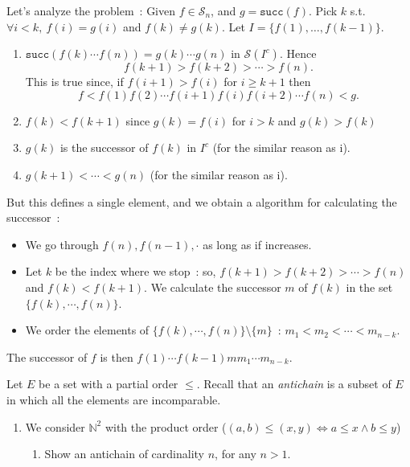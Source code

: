 \documentclass[a4paper,11pt]{exam}
\newcommand{\N}{\mathbb{N}}
\renewcommand{\S}{\mathcal{S}}
\begin{document}
\begin{questions}
\begin{enumerate}
\begin{enumerate}
          \begin{solution}
            \renewcommand{\succ}{\texttt{succ}}
            Let's analyze the problem~:
            Given $f \in \S_n$, and $g=\succ(f)$.
            Pick $k$ s.t. ${\forall i < k,}~f(i) = g(i)$ and $f(k) \neq g(k)$.
            Let $I = \{ f(1), \dots, f(k-1) \}$.
            \begin{enumerate}
              \item $\succ(f(k) \cdots f(n)) = g(k) \cdots g(n)$ in
                $\S(I^c)$. Hence 
                $$ f(k+1) > f(k+2) > \cdots > f(n). $$ 
                This is true since, if  $f(i+1) > f(i)$  for $ i\geq k+1$ then $$f<f(1)f(2)\cdots f(i+1)f(i)f(i+2) \cdots f(n)<g.$$
              \item $f(k) <f(k+1)$ since $g(k)=f(i)$ for $i>k$ and $g(k)>f(k)$
              \item $g(k)$ is the successor of $f(k)$ in $I^c$ (for the similar reason as i).
              \item $g(k+1) < \cdots < g(n)$ (for the similar reason as i).
            \end{enumerate}
           But this defines a single element, and we obtain a algorithm for calculating the successor~:
            \begin{itemize}
              \item We go through $f(n), f(n-1),\cdot$ as long as if increases.
              \item Let $k$ be the index where we stop~:
                so, $f(k+1) > f(k+2) > \cdots > f(n)$ and $f(k) < f(k+1)$. We calculate the successor $m$ of $f(k)$ in the set
                $\{ f(k), \cdots, f(n) \}$.
              \item We order the elements of $\{ f(k), \cdots, f(n) \}
                \setminus \{ m \}$~: $m_1 < m_2 < \cdots < m_{n-k}$.
            \end{itemize}
            The successor of $f$ is then
            $f(1) \cdots f(k-1) m m_1 \cdots m_{n-k}$.
          \end{solution}
      \end{enumerate}
  \end{enumerate} 

  \question
  Let $E$ be a set with a partial order $\leq$.
  Recall that an \textit{ antichain} is a subset of $E$ in which all the elements are incomparable.

  \begin{enumerate}
    \item We consider $ \N^2 $ with the product order ($(a,b)\leq(x,y) \iff a\leq x \wedge b \leq y$)
      \begin{enumerate}
        \item Show an  antichain of cardinality $n$, for any $n >1$.


\end{enumerate}
\end{enumerate}
\end{questions}
\end{document}

